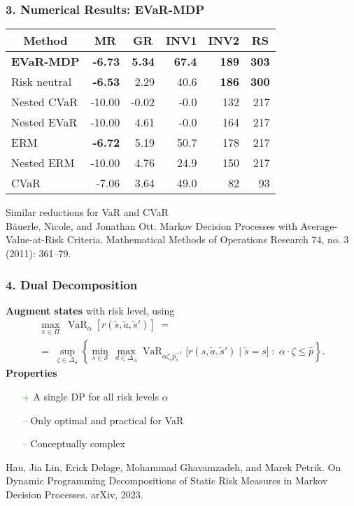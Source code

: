\documentclass{beamer}
\newcommand{\tc}[2]{\textcolor{#1}{#2}}
\newcommand{\tcr}[1]{\tc{red}{#1}}
\newcommand{\tcg}[1]{\tc{green}{#1}}
\DeclareMathOperator{\varo}{VaR}
\begin{document}
\begin{frame} \frametitle{3. Numerical Results: EVaR-MDP}
  \centering
\begin{tabular}{l|rrrrr}
\toprule
\multicolumn{1}{c|}{Method} & \multicolumn{1}{c}{MR} & \multicolumn{1}{c}{GR} & \multicolumn{1}{c}{INV1} & \multicolumn{1}{c}{INV2} & \multicolumn{1}{c}{RS}  \\
  \midrule
  \textbf{EVaR-MDP} & \textbf{-6.73} & \textbf{5.34} & \textbf{67.4} & \textbf{189} & \textbf{303} \\ 
  \midrule
   Risk neutral & \textbf{-6.53} & 2.29 & 40.6 & \textbf{186} & \textbf{300} \\
   Nested CVaR & -10.00 & -0.02 & -0.0 & 132 & 217 \\ 
   Nested EVaR & -10.00 & 4.61 & -0.0 & 164 & 217 \\ 
   ERM & \textbf{-6.72} & 5.19 & 50.7 & 178 & 217 \\ 
   Nested ERM & -10.00 & 4.76 & 24.9 & 150 & 217 \\ 
   CVaR & -7.06 & 3.64 & 49.0 & 82 & 93 \\
  \bottomrule
\end{tabular}
\vfill
Similar reductions for VaR and CVaR\\
{\tiny Bäuerle, Nicole, and Jonathan Ott. Markov Decision Processes with Average-Value-at-Risk Criteria. Mathematical Methods of Operations Research 74, no. 3 (2011): 361–79.
}
\end{frame}

\begin{frame} \frametitle{4. Dual Decomposition}
 \textbf{Augment states} with risk level, using 
 \begin{gather*}
   \max_{\pi\in \Pi} \; \varo_{\alpha}[{r(\tilde{s}, \tilde{a}, \tilde{s}')}] \; =\;  \\
   =\; \sup_{\zeta\in \Delta_S} \left\{  \min_{s\in\mathcal{S}}\, \max_{d\in \Delta_A} \varo_{\alpha \zeta_s \hat{p}_s^{-1}}\big[{r(s, \tilde{a}, \tilde{s}')}\mid \tilde{s}=s\big]  \;:\;   \alpha\cdot \zeta \leq \hat{p}\right\}.
\end{gather*}
  \vfill 
  \textbf{Properties}
  \begin{itemize}
  \item[\tcg{+}] A single DP for all risk levels $\alpha$
  \item[\tcr{--}] Only optimal and practical for VaR
  \item[\tcr{--}] Conceptually complex 
  \end{itemize}
  \vfill
  {\tiny Hau, Jia Lin, Erick Delage, Mohammad Ghavamzadeh, and Marek Petrik. On Dynamic Programming Decompositions of Static Risk Measures in Markov Decision Processes. arXiv, 2023.
}
\end{frame}
\end{document}

